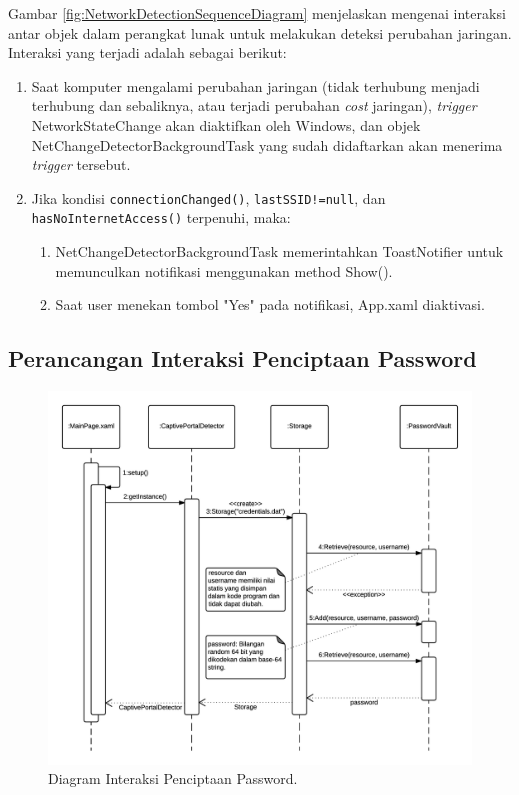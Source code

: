 Gambar \ref{fig:NetworkDetectionSequenceDiagram} menjelaskan mengenai interaksi antar objek dalam perangkat lunak untuk melakukan deteksi perubahan jaringan. Interaksi yang terjadi adalah sebagai berikut:

\begin{enumerate}
    \item{Saat komputer mengalami perubahan jaringan (tidak terhubung menjadi terhubung dan sebaliknya, atau terjadi perubahan \textit{cost} jaringan), \textit{trigger} NetworkStateChange akan diaktifkan oleh Windows, dan objek NetChangeDetectorBackgroundTask yang sudah didaftarkan akan menerima \textit{trigger} tersebut.}
    \item{Jika kondisi \texttt{connectionChanged()}, \texttt{lastSSID!=null}, dan \texttt{hasNoInternetAccess()} terpenuhi, maka:}
    \begin{enumerate}
        \item{NetChangeDetectorBackgroundTask memerintahkan ToastNotifier untuk memunculkan notifikasi menggunakan method Show().}
        \item{Saat user menekan tombol "Yes" pada notifikasi, App.xaml diaktivasi.}
    \end{enumerate}
\end{enumerate}

\subsection{Perancangan Interaksi Penciptaan Password}
\label{subsec:perancangan_interaksi_penciptaan_password}

\begin{figure}[!htb]
    \centering
    \includegraphics[scale=0.8]{Gambar/SequenceDiagramPasswordGeneration.png}
    \caption[Diagram Interaksi Penciptaan Password.]{Diagram Interaksi Penciptaan Password.} 
    \label{fig:PasswordGenerationSequenceDiagram}
\end{figure}

